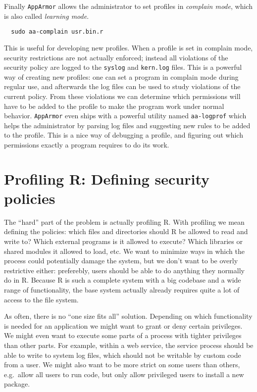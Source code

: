 \documentclass[article]{jss}
\newcommand{\R}{\textsf{R}\xspace}
\newcommand{\AppArmor}{\texttt{AppArmor}\xspace}
\begin{document}
Finally \AppArmor allows the administrator to set profiles in \emph{complain
mode}, which is also called \emph{learning mode}.
\begin{verbatim}
  sudo aa-complain usr.bin.r
\end{verbatim}
This is useful for developing new profiles. When a profile is set in complain
mode, security restrictions are not actually enforced; instead all violations
of the security policy are logged to the \texttt{syslog} and \texttt{kern.log}
files. This is a powerful way of creating new profiles: one can set a program in
complain mode during regular use, and afterwards the log files can be used to
study violations of the current policy. From these violations we can determine
which permissions will have to be added to the profile to make the program work
under normal behavior. \AppArmor even ships with a powerful utility named
\texttt{aa-logprof} which helps the administrator by parsing log files and
suggesting new rules to be added to the profile. This is a nice way of
debugging a profile, and figuring out which permissions exactly a program
requires to do its work.

\section[Profiling R: Defining security policies]{Profiling \R: Defining security policies}

The ``hard'' part of the problem is actually profiling \R. With
profiling we mean defining the policies: which files and directories should
\R be allowed to read and write to? Which external programs is it
allowed to execute? Which libraries or shared modules it allowed to load, etc.
We want to minimize ways in which the process could potentially damage the
system, but we don't want to be overly restrictive either: preferebly, users
should be able to do anything they normally do in \R. Because \R is
such a complete system with a big codebase and a wide range of functionality,
the base system actually already requires quite a lot of access to the file
system.

As often, there is no ``one size fits all'' solution. Depending on which
functionality is needed for an application we might want to grant or deny
certain privileges. We might even want to execute some parts of a process with
tighter privileges than other parts. For example, within a web service, the
service process should be able to write to system log files, which should not be
writable by custom code from a user. We might also want to be more strict on
some users than others, e.g.\ allow all users to run code, but only allow
privileged users to install a new package.
\end{document}
